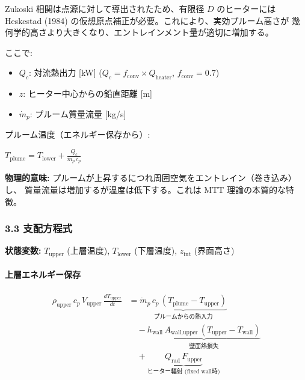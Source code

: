 \documentclass[a4paper,11pt]{article}
\begin{document}
Zukoski 相関は点源に対して導出されたため、有限径 $D$ のヒーターには
Heskestad (1984) の仮想原点補正が必要。これにより、実効プルーム高さが
幾何学的高さより大きくなり、エントレインメント量が適切に増加する。

ここで:

\begin{itemize} \item $Q_c$: 対流熱出力 [kW] ($Q_c = f_{\text{conv}} \times Q_{\text{heater}}$, $f_{\text{conv}} = 0.7$) \end{itemize}
\begin{itemize} \item $z$: ヒーター中心からの鉛直距離 [m] \end{itemize}
\begin{itemize} \item $\dot{m}_p$: プルーム質量流量 [kg/s] \end{itemize}

プルーム温度（エネルギー保存から）:

$
T_{\text{plume}} = T_{\text{lower}} + \frac{Q_c}{\dot{m}_p \, c_p}
$

\textbf{物理的意味:} プルームが上昇するにつれ周囲空気をエントレイン（巻き込み）し、
質量流量は増加するが温度は低下する。これは MTT 理論の本質的な特徴。

\subsubsection{3.3 支配方程式}

\textbf{状態変数:} $T_{\text{upper}}$ (上層温度), $T_{\text{lower}}$ (下層温度), $z_{\text{int}}$ (界面高さ)

\paragraph{上層エネルギー保存}

\begin{align*}
\rho_{\text{upper}} \, c_p \, V_{\text{upper}} \, \frac{dT_{\text{upper}}}{dt}
&= \underbrace{\dot{m}_p \, c_p \, (T_{\text{plume}} - T_{\text{upper}})}_{\text{プルームからの熱入力}} \\
&\quad - \underbrace{h_{\text{wall}} \, A_{\text{wall,upper}} \, (T_{\text{upper}} - T_{\text{wall}})}_{\text{壁面熱損失}} \\
&\quad + \underbrace{Q_{\text{rad}} \, F_{\text{upper}}}_{\text{ヒーター輻射 (fixed wall時)}}
\end{align*}
\end{document}

